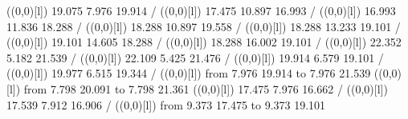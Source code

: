 {\setplotsymbol ({\makebox(0,0)[l]{\tencirc{}}})
{\color[rgb]{0,0,0} 19.075  7.976 19.914 /
}%
%
%
\linethickness=1pt
\setplotsymbol ({\makebox(0,0)[l]{\tencirc{}}})
{\color[rgb]{0,0,0} 17.475 10.897 16.993 /
}%
%
%
\linethickness=1pt
\setplotsymbol ({\makebox(0,0)[l]{\tencirc{}}})
{\color[rgb]{0,0,0} 16.993 11.836 18.288 /
}%
%
%
\linethickness=1pt
\setplotsymbol ({\makebox(0,0)[l]{\tencirc{}}})
{\color[rgb]{0,0,0} 18.288 10.897 19.558 /
}%
%
%
\linethickness=1pt
\setplotsymbol ({\makebox(0,0)[l]{\tencirc{}}})
{\color[rgb]{0,0,0} 18.288 13.233 19.101 /
}%
%
%
\linethickness=1pt
\setplotsymbol ({\makebox(0,0)[l]{\tencirc{}}})
{\color[rgb]{0,0,0} 19.101 14.605 18.288 /
}%
%
%
\linethickness=1pt
\setplotsymbol ({\makebox(0,0)[l]{\tencirc{}}})
{\color[rgb]{0,0,0} 18.288 16.002 19.101 /
}%
%
%
\linethickness=1pt
\setplotsymbol ({\makebox(0,0)[l]{\tencirc{}}})
{\color[rgb]{0,0,0} 22.352  5.182 21.539 /
}%
%
%
\linethickness=1pt
\setplotsymbol ({\makebox(0,0)[l]{\tencirc{}}})
{\color[rgb]{0,0,0} 22.109  5.425 21.476 /
}%
%
%
\linethickness=1pt
\setplotsymbol ({\makebox(0,0)[l]{\tencirc{}}})
{\color[rgb]{0,0,0} 19.914  6.579 19.101 /
}%
%
%
\linethickness=1pt
\setplotsymbol ({\makebox(0,0)[l]{\tencirc{}}})
{\color[rgb]{0,0,0} 19.977  6.515 19.344 /
}%
%
%
\linethickness=1pt
\setplotsymbol ({\makebox(0,0)[l]{\tencirc{}}})
{\color[rgb]{0,0,0}\putrule from  7.976 19.914 to  7.976 21.539
}%
%
%
\linethickness=1pt
\setplotsymbol ({\makebox(0,0)[l]{\tencirc{}}})
{\color[rgb]{0,0,0}\putrule from  7.798 20.091 to  7.798 21.361
}%
%
%
\linethickness=1pt
\setplotsymbol ({\makebox(0,0)[l]{\tencirc{}}})
{\color[rgb]{0,0,0} 17.475  7.976 16.662 /
}%
%
%
\linethickness=1pt
\setplotsymbol ({\makebox(0,0)[l]{\tencirc{}}})
{\color[rgb]{0,0,0} 17.539  7.912 16.906 /
}%
%
%
\linethickness=1pt
\setplotsymbol ({\makebox(0,0)[l]{\tencirc{}}})
{\color[rgb]{0,0,0}\putrule from  9.373 17.475 to  9.373 19.101
}%
%
%
}
